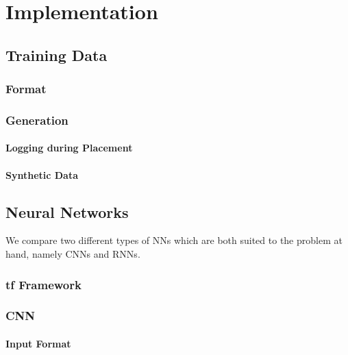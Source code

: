 
\chapter{Implementation}\label{ch:implementation}
\glsresetall %

\section{Training Data}

\subsection{Format}

\subsection{Generation}

\subsubsection{Logging during Placement}

\subsubsection{Synthetic Data}

\section{Neural Networks}

We compare two different types of \glspl{NN} which are both suited to the problem at hand, namely \glspl{CNN} and \glspl{RNN}.

\subsection{\gls{tf} Framework}

\subsection{\gls{CNN}}

\subsubsection{Input Format}

